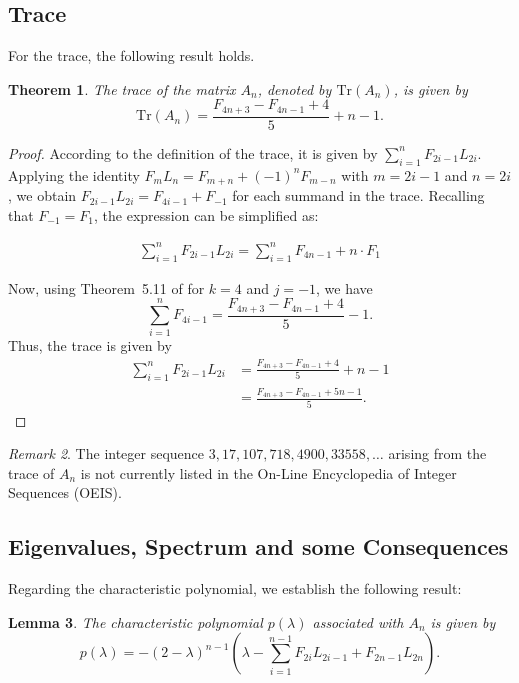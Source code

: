 \documentclass[11pt]{birkjour}
\newtheorem{thm}{Theorem}[section]
\newtheorem{lem}[thm]{Lemma}
\theoremstyle{definition}
\theoremstyle{remark}
\newtheorem{rem}[thm]{Remark}
\numberwithin{equation}{section}
\begin{document}
\subsection{Trace}
For the trace, the following result holds.
\begin{thm}\label{tr}
The trace of the matrix $A_n$, denoted by $\mathrm{Tr}(A_n)$, is given by
\[
\mathrm{Tr}(A_n)=\frac{F_{4n+3}-F_{4n-1}+4}{5}+n-1.
\]
\end{thm}

\begin{proof}
According to the definition of the trace, it is given by $\displaystyle\sum_{i=1}^{n} F_{2i-1} L_{2i}$. 
Applying the identity $F_m L_n = F_{m+n} + (-1)^n F_{m-n}$ with $m = 2i - 1$ and $n = 2i$, we obtain
$F_{2i-1} L_{2i} = F_{4i-1} + F_{-1}$ for each summand in the trace.
Recalling that $F_{-1} = F_1$, the expression can be simplified as:

\begin{align*}\label{tr}
    \displaystyle\sum_{i=1}^{n}F_{2i-1}L_{2i}=\displaystyle\sum_{i=1}^{n}F_{4n-1}+n\cdot F_1
\end{align*}

\noindent Now, using Theorem~5.11 of \cite{koshy} for $k = 4$ and $j = -1$, we have
\[
\sum_{i=1}^{n} F_{4i-1}
= \frac{F_{4n+3} - F_{4n-1} + 4}{5} - 1.
\]
Thus, the trace is given by
\begin{align*}
\sum_{i=1}^{n} F_{2i-1} L_{2i}
&= \frac{F_{4n+3} - F_{4n-1} + 4}{5} + n - 1 \\
&= \frac{F_{4n+3} - F_{4n-1} + 5n - 1}{5}.
\end{align*}
\end{proof}


\begin{rem}
The integer sequence $3,17,107,718,4900,33558,\ldots$ arising from the trace of $A_n$ is not currently listed in the On-Line Encyclopedia of Integer Sequences (OEIS).
\end{rem}

\subsection{Eigenvalues, Spectrum and some Consequences}
Regarding the characteristic polynomial, we establish the following result:

\begin{lem}\label{charp}
The characteristic polynomial $p(\lambda)$ associated with $A_n$ is given by
\[
p(\lambda)=-(2-\lambda)^{n-1}\left(\lambda-\displaystyle\sum_{i=1}^{n-1}F_{2i}L_{2i-1}+F_{2n-1}L_{2n}\right).
\]
\end{lem}
\end{document}
